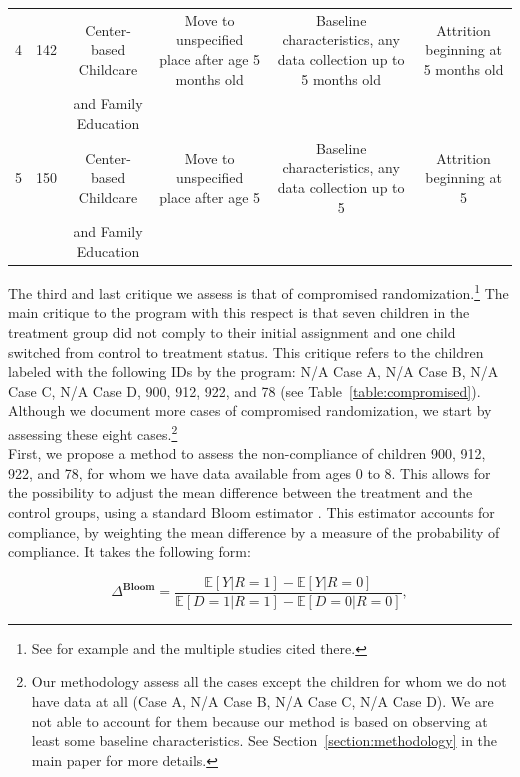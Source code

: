 \begin{appendices}
\begin{table}
\begin{threeparttable}
\begin{tabular}{cccccc}
4 & 142 & Center-based Childcare & Move to unspecified place after age 5 months old & Baseline characteristics, any data collection up to 5 months old & Attrition beginning at 5 months old \\
 &  & and Family Education &  &  & \\
5 & 150 & Center-based Childcare & Move to unspecified place after age 5 & Baseline characteristics, any data collection up to 5 & Attrition beginning at 5 \\
 &  & and Family Education &  &  & \\ \hline \hline 
\end{tabular}
\end{threeparttable}
\end{table}

\restoregeometry

\noindent The third and last critique we assess is that of compromised randomization.\footnote{See for example \citet{} and the multiple studies cited there.} The main critique to the program with this respect is that seven children in the treatment group did not comply to their initial assignment and one child switched from control to treatment status. This critique refers to the children labeled with the following IDs by the program: N/A Case A, N/A Case B, N/A Case C, N/A Case D, 900, 912, 922, and 78 (see Table~\ref{table:compromised}). Although we document more cases of compromised randomization, we start by assessing these eight cases.\footnote{Our methodology assess all the cases except the children for whom we do not have data at all (Case A, N/A Case B, N/A Case C, N/A Case D). We are not able to account for them because our method is based on observing at least some baseline characteristics. See Section~\ref{section:methodology} in the main paper for more details.}\\

\noindent First, we propose a method to assess the non-compliance of children 900, 912, 922, and 78, for whom we have data available from ages 0 to 8. This allows for the possibility to adjust the mean difference between the treatment and the control groups, using a standard Bloom estimator \citep{Bloom_1984_ER}. This estimator accounts for compliance, by weighting the mean difference by a measure of the probability of compliance. It takes the following form: 

\begin{equation}
\Delta^{\textbf{Bloom}} = \frac{\mathbb{E} \left[ Y | R = 1 \right] - \mathbb{E} \left[ Y | R = 0 \right] }{\mathbb{E} \left[ D = 1 | R = 1 \right] - \mathbb{E} \left[ D = 0 | R = 0 \right]}, 
\end{equation}


\end{appendices}
